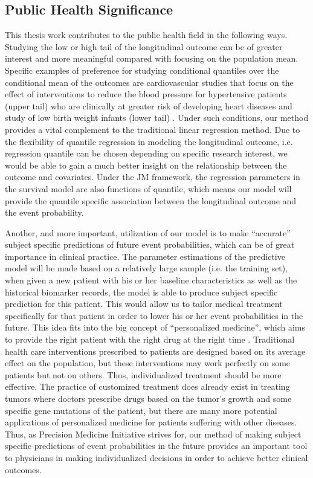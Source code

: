 \subsection{Public Health Significance}\label{sec:significance}
This thesis work contributes to the public health field in the following ways. Studying the low or high tail of the longitudinal outcome can be of greater interest and more meaningful compared with focusing on the population mean. Specific examples of preference for studying conditional quantiles over the conditional mean of the outcomes are cardiovascular studies that focus on the effect of interventions to reduce the blood pressure for hypertensive patients (upper tail) who are clinically at greater risk of developing heart diseases and study of low birth weight infants (lower tail) \citep{koenker2001quantile}. Under such conditions, our method provides a vital complement to the traditional linear regression method. Due to the flexibility of quantile regression in modeling the longitudinal outcome, i.e. regression quantile can be chosen depending on specific research interest, we would be able to gain a much better insight on the relationship between the outcome and covariates. Under the JM framework, the regression parameters in the survival model are also functions of quantile, which means our model will provide the quantile specific association between the longitudinal outcome and the event probability. \par

Another, and more important, utilization of our model is to make ``accurate'' subject specific predictions of future event probabilities, which can be of great importance in clinical practice. The parameter estimations of the predictive model will be made based on a relatively large sample (i.e. the training set), when given a new patient with his or her baseline characteristics as well as the historical biomarker records, the model is able to produce subject specific prediction for this patient. This would allow us to tailor medical treatment specifically for that patient in order to lower his or her event probabilities in the future. This idea fits into the big concept of ``personalized medicine'', which aims to provide the right patient with the right drug at the right time \citep{us2013paving}. Traditional health care interventions prescribed to patients are designed based on its average effect on the population, but these interventions may work perfectly on some patients but not on others. Thus, individualized treatment should be more effective. The practice of customized treatment does already exist in treating tumors where doctors prescribe drugs based on the tumor's growth and some specific gene mutations of the patient, but there are many more potential applications of personalized medicine for patients suffering with other diseases. Thus, as Precision Medicine Initiative strives for, our method of making subject specific predictions of event probabilities in the future provides an important tool to physicians in making individualized decisions in order to achieve better clinical outcomes. 




